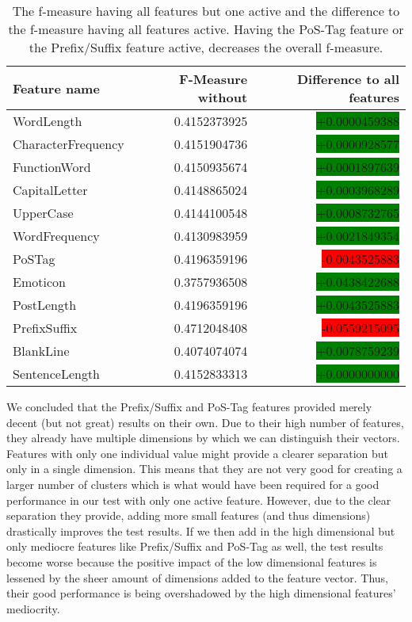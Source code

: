 \begin{table}[h]
	\begin{center}
    \begin{tabular}{l|r|r}
	Feature name & F-Measure without & Difference to all features \\ \hline
	WordLength & 0.4152373925 & \colorbox{green}{+0.0000459388} \\ \hline
	CharacterFrequency & 0.4151904736 & \colorbox{green}{+0.0000928577} \\ \hline
	FunctionWord  & 0.4150935674 & \colorbox{green}{+0.0001897639} \\ \hline
	CapitalLetter & 0.4148865024 & \colorbox{green}{+0.0003968289} \\ \hline
	UpperCase & 0.4144100548 & \colorbox{green}{+0.0008732765} \\ \hline
	WordFrequency &	0.4130983959 & \colorbox{green}{+0.0021849354} \\ \hline
	PoSTag & 0.4196359196 & \colorbox{red}{-0.0043525883} \\ \hline
	Emoticon &	0.3757936508 & \colorbox{green}{+0.0438422688} \\ \hline
	PostLength & 0.4196359196 & \colorbox{green}{+0.0043525883} \\ \hline
	PrefixSuffix & 0.4712048408 & \colorbox{red}{-0.0559215095} \\ \hline
	BlankLine & 0.4074074074 & \colorbox{green}{+0.0078759239} \\ \hline
	SentenceLength & 0.4152833313 & \colorbox{green}{+0.0000000000} \\
    \end{tabular}
	\caption{The f-measure having all features but one active and the difference to the f-measure having all features active. Having the PoS-Tag feature or the Prefix/Suffix feature active, decreases the overall f-measure.}
	\label{tab:feature_evaluation_1}
	\end{center}
\end{table}

We concluded that the Prefix/Suffix and PoS-Tag features provided merely decent (but not great) results on their own.
Due to their high number of features, they already have multiple dimensions by which we can distinguish their vectors.
Features with only one individual value might provide a clearer separation but only in a single dimension.
This means that they are not very good for creating a larger number of clusters which is what would have been required for a good performance in our test with only one active feature.
However, due to the clear separation they provide, adding more small features (and thus dimensions) drastically improves the test results.
If we then add in the high dimensional but only mediocre features like Prefix/Suffix and PoS-Tag as well, the test results become worse because the positive impact of the low dimensional features is lessened by the sheer amount of dimensions added to the feature vector.
Thus, their good performance is being overshadowed by the high dimensional features' mediocrity.


